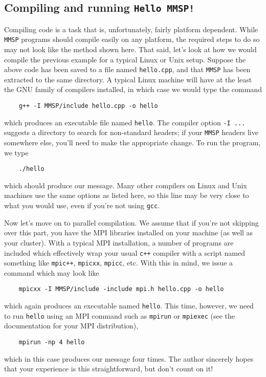 \subsection{Compiling and running {\tt Hello MMSP!}}
Compiling code is a task that is, unfortunately, fairly platform dependent.  While {\tt MMSP} programs should compile easily on any platform, the required steps to do so may not look like the method shown here.  That said, let's look at how we would compile the previous example for a typical Linux or Unix setup.  Suppose the above code has been saved to a file named {\tt hello.cpp}, and that {\tt MMSP} has been extracted to the same directory.  A typical Linux machine will have at the least the GNU family of compilers installed, in which case we would type the command 
\begin{shadebox}
\begin{verbatim}
    g++ -I MMSP/include hello.cpp -o hello
\end{verbatim}
\end{shadebox}
which produces an executable file named {\tt hello}.  The compiler option {\tt -I ...} suggests a directory to search for non-standard headers; if your {\tt MMSP} headers live somewhere else, you'll need to make the appropriate change.  To run the program, we type
\begin{shadebox}
\begin{verbatim}
    ./hello
\end{verbatim}
\end{shadebox}
which should produce our message.  Many other compilers on Linux and Unix machines use the same options as listed here, so this line may be very close to what you would use, even if you're not using {\tt gcc}.

Now let's move on to parallel compilation.  We assume that if you're not skipping over this part, you have the MPI libraries installed on your machine (as well as your cluster).  With a typical MPI installation, a number of programs are included which effectively wrap your usual {\tt c++} compiler with a script named something like {\tt mpic++}, {\tt mpicxx}, {\tt mpicc}, etc.  With this in mind, we issue a command which may look like
\begin{shadebox}
\begin{verbatim}
    mpicxx -I MMSP/include -include mpi.h hello.cpp -o hello
\end{verbatim}
\end{shadebox}
which again produces an executable named {\tt hello}.  This time, however, we need to run {\tt hello} using an MPI command such as {\tt mpirun} or {\tt mpiexec} (see the documentation for your MPI distribution),
\begin{shadebox}
\begin{verbatim}
    mpirun -np 4 hello
\end{verbatim}
\end{shadebox}
which in this case produces our message four times.  The author sincerely hopes that your experience is this straightforward, but don't count on it!

